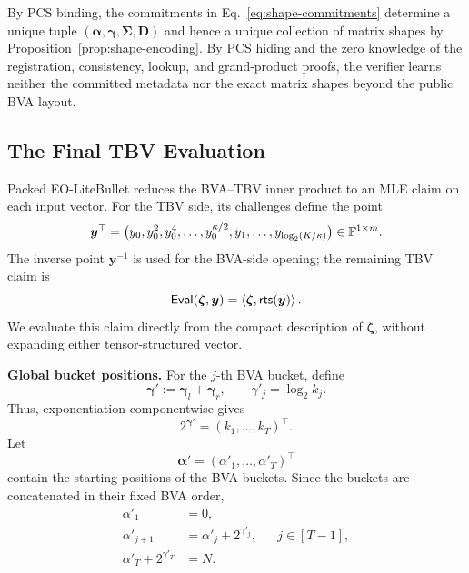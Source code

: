 By PCS binding, the commitments in Eq.~\eqref{eq:shape-commitments}
determine a unique tuple $(\bm\alpha,\bm\gamma,\bm\Sigma,\bm D)$ and hence a unique
collection of matrix shapes by
Proposition~\ref{prop:shape-encoding}.  By PCS hiding and the zero knowledge
of the registration, consistency, lookup, and grand-product proofs, the
verifier learns neither the committed metadata nor the exact matrix shapes
beyond the public BVA layout.

\subsection{The Final TBV Evaluation}
\label{sec:final-tbv-evaluation}

Packed EO-LiteBullet reduces the BVA--TBV inner product to an MLE claim on
each input vector.  For the TBV side, its challenges define the point
\begin{equation}
\label{eq:final-tbv-point}
\bm y^\top
=
\bigl(
y_0,y_0^2,y_0^4,\ldots,y_0^{\kappa/2},
	y_1,\ldots,y_{\log_2(K/\kappa)}
\bigr)
\in{\mathbb{F}}^{1\times m}.
\end{equation}
The inverse point $\bm y^{-1}$ is used for the BVA-side opening; the remaining
TBV claim is
\[
    \mathsf{Eval}(\bm\zeta, \bm y)
    =
    \left\langle
        \bm\zeta,
        {\sf rts}(\bm y)
    \right\rangle .
\]
We evaluate this claim directly from the compact description of
$\bm\zeta$, without expanding either tensor-structured vector.

\mysmallskip\noindent
\textbf{Global bucket positions.}
For the $j$-th BVA bucket, define
\begin{equation}
\label{eq:global-bucket-gamma}
    \bm\gamma'
    :=
    \bm\gamma_l+\bm\gamma_r,
    \qquad
    \gamma'_j
    =
    \log_2 k_j.
\end{equation}
Thus, exponentiation componentwise gives
\[
    2^{\bm\gamma'}
    =
    (k_1,\ldots,k_T)^\top.
\]
Let
\[
    \bm\alpha'
    =
    (\alpha'_1,\ldots,\alpha'_T)^\top
\]
contain the starting positions of the BVA buckets.  Since the buckets are
concatenated in their fixed BVA order,
\begin{equation}
\label{eq:global-bucket-offsets}
\begin{aligned}
    \alpha'_1&=0,\\
    \alpha'_{j+1}
        &=\alpha'_j+2^{\gamma'_j},
        &&j\in[T-1],\\
    \alpha'_T+2^{\gamma'_T}
        &=N.
\end{aligned}
\end{equation}

